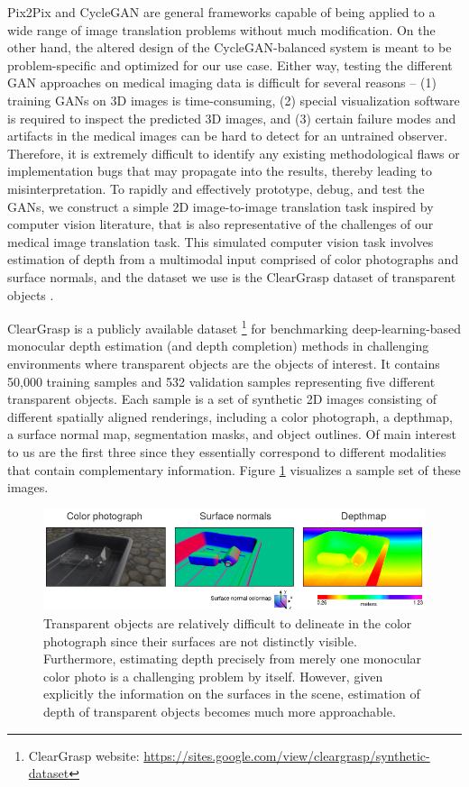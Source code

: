 Pix2Pix and CycleGAN are general frameworks capable of being applied to a wide range of image translation problems without much modification. On the other hand, the altered design of the CycleGAN-balanced system is meant to be problem-specific and optimized for our use case. Either way, testing the different GAN approaches on medical imaging data is difficult for several reasons -- (1) training GANs on 3D images is time-consuming, (2) special visualization software is required to inspect the predicted 3D images, and (3) certain failure modes and artifacts in the medical images can be hard to detect for an untrained observer. Therefore, it is extremely difficult to identify any existing methodological flaws or implementation bugs that may propagate into the results, thereby leading to misinterpretation. To rapidly and effectively prototype, debug, and test the GANs, we construct a simple 2D image-to-image translation task inspired by computer vision literature, that is also representative of the challenges of our medical image translation task. This simulated computer vision task involves estimation of depth from a multimodal input comprised of color photographs and surface normals, and the dataset we use is the ClearGrasp dataset of transparent objects \cite{sajjan2020clear}.

ClearGrasp is a publicly available dataset \footnote{ClearGrasp website: \url{https://sites.google.com/view/cleargrasp/synthetic-dataset}} for benchmarking deep-learning-based monocular depth estimation (and depth completion) methods in challenging environments where transparent objects are the objects of interest. It contains 50,000 training samples and 532 validation samples representing five different transparent objects. Each sample is a set of synthetic 2D images consisting of different spatially aligned renderings, including a color photograph, a depthmap, a surface normal map, segmentation masks, and object outlines. Of main interest to us are the first three since they essentially correspond to different modalities that contain complementary information. Figure \ref{fig:cleargrasp_sample} visualizes a sample set of these images. 

\begin{figure}[h!]
    \centering
    \includegraphics[width=\linewidth]{figures/Cleargrasp_data/cleargrasp_sample-2.png}
    \caption{Transparent objects are relatively difficult to delineate in the color photograph since their surfaces are not distinctly visible. Furthermore, estimating depth precisely from merely one monocular color photo is a challenging problem by itself. However, given explicitly the information on the surfaces in the scene, estimation of depth of transparent objects becomes much more approachable.}
    \label{fig:cleargrasp_sample}
\end{figure}{}

